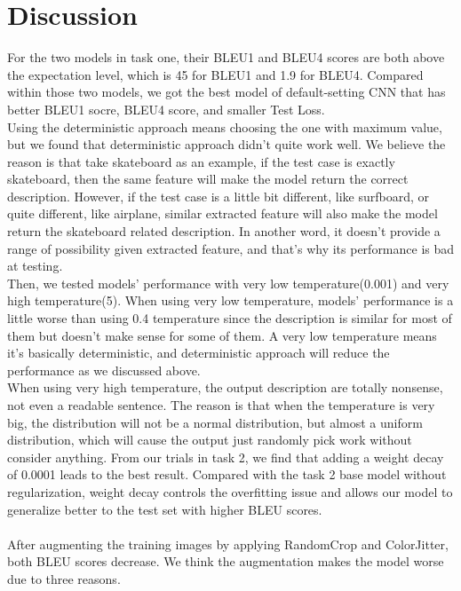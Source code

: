 \documentclass{article}
\begin{document}
    \section{Discussion}
    For the two models in task one, their BLEU1 and BLEU4 scores are both above the expectation level, which is 45 for BLEU1 and 1.9 for BLEU4.
    Compared within those two models, we got the best model of default-setting CNN that has better BLEU1 socre, BLEU4 score, and smaller Test Loss.\\
    Using the deterministic approach means choosing the one with maximum value, but we found that deterministic approach didn't quite work well.
    We believe the reason is that take skateboard as an example, if the test case is exactly skateboard, then the same feature will make the model
    return the correct description.
    However, if the test case is a little bit different, like surfboard, or quite different, like airplane, similar extracted feature will also make the model return the skateboard related description.
    In another word, it doesn't provide a range of possibility given extracted feature, and that's why its performance is bad at testing.\\
    Then, we tested models' performance with very low temperature(0.001) and very high temperature(5).
    When using very low temperature, models' performance is a little worse than using 0.4 temperature since the description is similar for most of them but doesn't make sense for some of them.
    A very low temperature means it's basically deterministic, and deterministic approach will reduce the performance as we discussed above.\\
    When using very high temperature, the output description are totally nonsense, not even a readable sentence.
    The reason is that when the temperature is very big, the distribution will not be a normal distribution, but almost a uniform distribution, which will cause the output
    just randomly pick work without consider anything.
    From our trials in task 2, we find that adding a weight decay of 0.0001 leads to the best result. Compared with the task 2 base model without regularization, weight decay controls the overfitting issue and allows our model to generalize better to the test set with higher BLEU scores. \\ \\
    After augmenting the training images by applying RandomCrop and ColorJitter, both BLEU scores decrease. We think the augmentation makes the model worse due to three reasons. \\ \\
\end{document}
